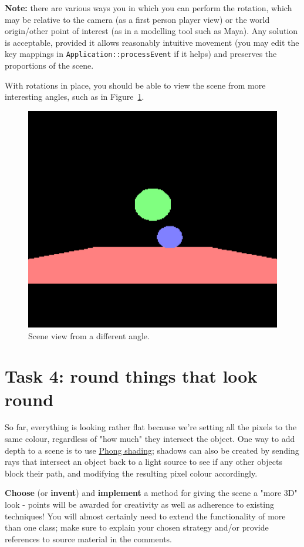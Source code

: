 \documentclass{../../../fal_assignment}
\begin{document}
\textbf{Note:} there are various ways you in which you can perform the rotation, which may be relative to the camera (as a first person player view) or the world origin/other point of interest (as in a modelling tool such as Maya). Any solution is acceptable, provided it allows reasonably intuitive movement (you may edit the key mappings in \lstinline{Application::processEvent} if it helps) and preserves the proportions of the scene.

With rotations in place, you should be able to view the scene from more interesting angles, such as in  Figure~\ref{fig:rotate}.

\begin{figure}[ht]
	\begin{center}
		\includegraphics[width=0.25\linewidth]{rotate}
	\end{center}
	\caption{Scene view from a different angle.}
	\label{fig:rotate}
\end{figure}

\section*{Task 4: round things that look round}

So far, everything is looking rather flat because we're setting all the pixels to the same colour, regardless of "how much" they intersect the object. One way to add depth to a scene is to use \href{https://users.cs.northwestern.edu/~ago820/cs395/Papers/Phong_1975.pdf}{Phong shading}; shadows can also be created by sending rays that intersect an object back to a light source to see if any other objects block their path, and modifying the resulting pixel colour accordingly.

\textbf{Choose} (or \textbf{invent}) and \textbf{implement} a method for giving the scene a "more 3D" look - points will be awarded for creativity as well as adherence to existing techniques! You will almost certainly need to extend the functionality of more than one class; make sure to explain your chosen strategy and/or provide references to source material in the comments.
\end{document}
